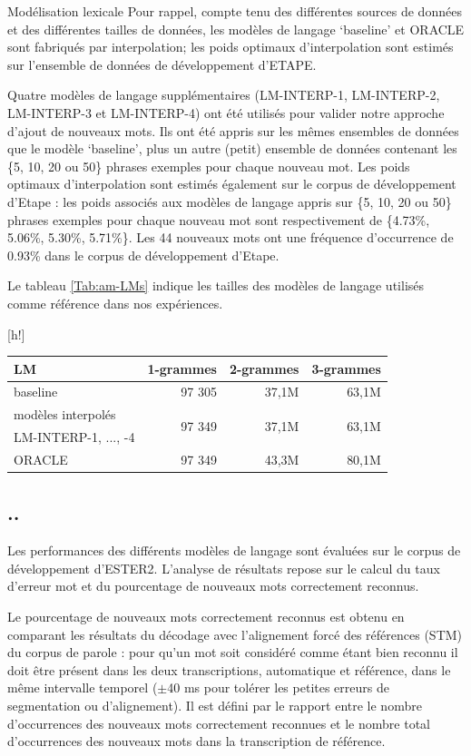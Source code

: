 \documentclass{style/these}
\makeatletter
\renewcommand\familydefault{ptm}
\renewenvironment{table}%
{ \renewcommand{\familydefault}{ptm}\selectfont
  \@float{table}}
  {\end@float}
\newcommand{\hiddensubsection}[1]{
    \stepcounter{subsection}
    \subsection*{\arabic{chapter}.\arabic{section}.\arabic{subsection}\hspace{1em}{#1}}
}
\makeatother
\begin{document}
\begin{part}{Modélisation lexicale}
Pour rappel, compte tenu des différentes sources de données et des différentes tailles de données, les modèles de langage `baseline' et ORACLE sont fabriqués par interpolation; les poids optimaux d'interpolation sont estimés sur l'ensemble de données de développement d'ETAPE.

Quatre modèles de langage supplémentaires (LM-INTERP-1, LM-INTERP-2, LM-INTERP-3 et LM-INTERP-4) ont été utilisés pour valider notre approche d'ajout de nouveaux mots.
Ils ont été appris sur les mêmes ensembles de données que le modèle `baseline', plus un autre (petit) ensemble de données contenant les \{5, 10, 20 ou 50\} phrases exemples pour chaque nouveau mot. Les poids optimaux d'interpolation sont estimés également sur le corpus de développement d'Etape : les poids associés aux modèles de langage appris sur \{5, 10, 20 ou 50\} phrases exemples pour chaque nouveau mot sont respectivement de \{4.73\%, 5.06\%, 5.30\%, 5.71\%\}. 
Les 44 nouveaux mots ont une fréquence d'occurrence de 0.93\% dans le corpus de développement d'Etape.

Le tableau \ref{Tab:am-LMs} indique les tailles des modèles de langage utilisés comme référence dans nos expériences.

\begin{table}[h!]
\centering
\begin{tabular}{|l|r|r|r|}
\hline
\textbf{LM}  		& \textbf{1-grammes} 		& \textbf{2-grammes} 		& \textbf{3-grammes} 		\\ \hline
baseline		& 97 305  			& 37,1M   			& 63,1M				\\ \hline
modèles interpolés 	& \multirow{2}{*}{97 349}	& \multirow{2}{*}{37,1M}	& \multirow{2}{*}{63,1M}	\\ 
LM-INTERP-1, ..., -4	&				&				&				\\ \hline
ORACLE  		& 97 349  			& 43,3M  			& 80,1M 			\\ \hline
\end{tabular}
\caption{Taille des modèles de langage de référence}
\label{Tab:am-LMs}
\end{table}


\hiddensubsection{Résultats}

Les performances des différents modèles de langage sont évaluées sur le corpus de développement d'ESTER2. 
L'analyse de résultats repose sur le calcul du taux d'erreur mot et du pourcentage de nouveaux mots correctement reconnus. 

Le pourcentage de nouveaux mots correctement reconnus est obtenu en comparant les résultats du décodage avec l'alignement forcé des références (\acrshort{STM}) du corpus de parole : pour qu'un mot soit considéré comme étant bien reconnu il doit être présent dans les deux transcriptions, automatique et référence, dans le même intervalle temporel ($\pm$40 ms pour tolérer les petites erreurs de segmentation ou d'alignement). 
Il est défini par le rapport entre le nombre d'occurrences des nouveaux mots correctement reconnues et le nombre total d'occurrences des nouveaux mots dans la transcription de référence. 


\end{part}
\end{document}
